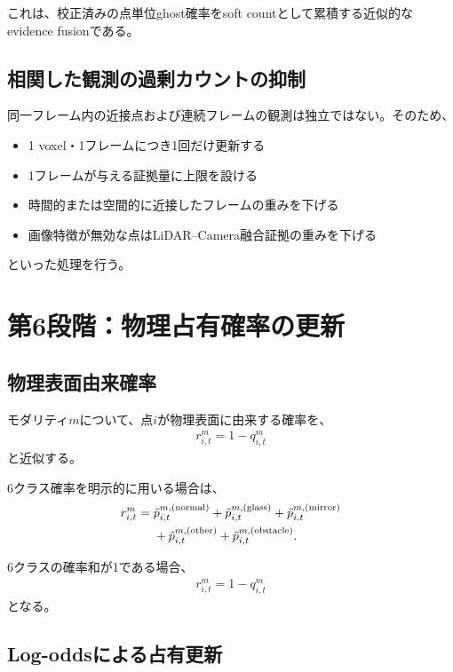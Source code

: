 \documentclass[uplatex,a4paper,11pt]{jsarticle}
\begin{document}
これは、校正済みの点単位ghost確率をsoft countとして累積する近似的なevidence fusionである。

\subsection{相関した観測の過剰カウントの抑制}

同一フレーム内の近接点および連続フレームの観測は独立ではない。そのため、
\begin{itemize}
  \item 1 voxel・1フレームにつき1回だけ更新する
  \item 1フレームが与える証拠量に上限を設ける
  \item 時間的または空間的に近接したフレームの重みを下げる
  \item 画像特徴が無効な点はLiDAR--Camera融合証拠の重みを下げる
\end{itemize}
といった処理を行う。

\section{第6段階：物理占有確率の更新}

\subsection{物理表面由来確率}

モダリティ$m$について、点$i$が物理表面に由来する確率を、
\begin{align}
  r_{i,t}^{m}
  =
  1-q_{i,t}^{m}
\end{align}
と近似する。

6クラス確率を明示的に用いる場合は、
\begin{align}
  r_{i,t}^{m}
  ={}&
  \tilde{p}_{i,t}^{m,(\mathrm{normal})}
  +
  \tilde{p}_{i,t}^{m,(\mathrm{glass})}
  +
  \tilde{p}_{i,t}^{m,(\mathrm{mirror})}
  \notag\\
  &+
  \tilde{p}_{i,t}^{m,(\mathrm{other})}
  +
  \tilde{p}_{i,t}^{m,(\mathrm{obstacle})}.
\end{align}

6クラスの確率和が1である場合、
\begin{align}
  r_{i,t}^{m}
  =
  1-q_{i,t}^{m}
\end{align}
となる。

\subsection{Log-oddsによる占有更新}
\end{document}
